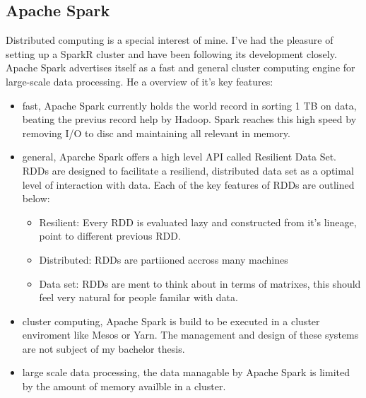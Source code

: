 \documentclass{article}
\begin{document}
    \subsection{Apache Spark}
    Distributed computing is a special interest of mine. I've had the pleasure of setting up a SparkR cluster and have been following its development closely. Apache Spark advertises itself as a fast and general cluster computing engine for large-scale data processing. He a overview of it's key features:
    \begin{itemize}
        \item fast, Apache Spark currently holds the world record in sorting 1 TB on data, beating the previus record help by Hadoop. Spark reaches this high speed by removing I/O to disc and maintaining all relevant in memory.
        \item general, Aparche Spark offers a high level API called Resilient Data Set. RDDs are designed to facilitate a resiliend, distributed data set as a optimal level of interaction with data. Each of the key features of RDDs are outlined below:
        \begin{itemize}
            \item Resilient: Every RDD is evaluated lazy and constructed from it's lineage, point to different previous RDD.
            \item Distributed: RDDs are partiioned accross many machines
            \item Data set: RDDs are ment to think about in terms of matrixes, this should feel very natural for people familar with data.
        \end{itemize}
        \item cluster computing, Apache Spark is build to be executed in a cluster enviroment like Mesos or Yarn. The management and design of these systems are not subject of my bachelor thesis.
        \item large scale data processing, the data managable by Apache Spark is limited by the amount of memory availble in a cluster.

    \end{itemize}
\end{document}
